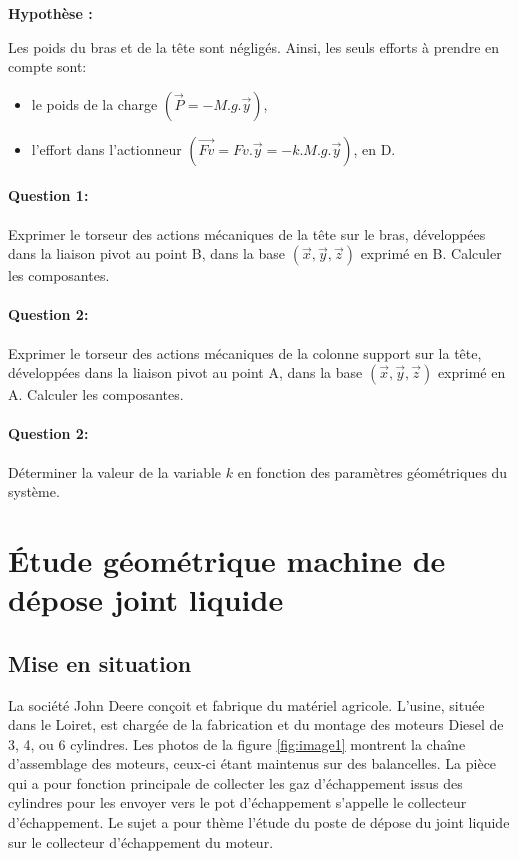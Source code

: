 \textbf{Hypothèse :}

Les poids du bras et de la tête sont négligés. Ainsi, les seuls efforts à prendre en compte sont:
\begin{itemize}
 \item le poids de la charge $(\overrightarrow{P}=-M.g.\overrightarrow{y})$,
 \item l'effort dans l'actionneur $(\overrightarrow{Fv}=Fv.\overrightarrow{y}=-k.M.g.\overrightarrow{y})$, en D.
\end{itemize}

\newpage

\paragraph{Question 1:} Exprimer le torseur des actions mécaniques de la tête sur le bras, développées dans la liaison pivot au point B, dans la base $(\overrightarrow{x},\overrightarrow{y},\overrightarrow{z})$ exprimé en B. Calculer les composantes.

\paragraph{Question 2:} Exprimer le torseur des actions mécaniques de la colonne support sur la tête, développées dans la liaison pivot au point A, dans la base $(\overrightarrow{x},\overrightarrow{y},\overrightarrow{z})$ exprimé en A. Calculer les composantes.

\paragraph{Question 2:} Déterminer la valeur de la variable $k$ en fonction des paramètres géométriques du système.

\newpage

\section{Étude géométrique machine de dépose joint liquide}

\subsection{Mise en situation}

La société John Deere conçoit et fabrique du matériel agricole. L'usine, située dans le Loiret, est chargée de la fabrication et du montage des moteurs Diesel de 3, 4, ou 6 cylindres.
Les photos de la figure \ref{fig:image1} montrent la chaîne d'assemblage des moteurs, ceux-ci étant maintenus sur des balancelles.
La pièce qui a pour fonction principale de collecter les gaz d'échappement issus des cylindres pour les envoyer vers le pot d'échappement s'appelle le collecteur d'échappement.
Le sujet a pour thème l'étude du poste de dépose du joint liquide sur le collecteur d'échappement du moteur.

